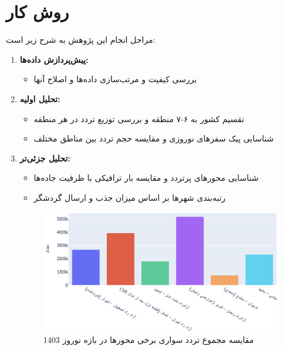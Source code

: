 \documentclass[a4paper, 12pt]{article}
\begin{document}
\section{روش کار}
مراحل انجام این پژوهش به شرح زیر است:
\begin{enumerate}
    \item \textbf{پیش‌پردازش داده‌ها:}
        \begin{itemize}
            \item بررسی کیفیت و مرتب‌سازی داده‌ها و اصلاح آنها
        \end{itemize}

    \item \textbf{تحلیل اولیه:} 
        \begin{itemize}
            \item تقسیم کشور به ۶-۷ منطقه و بررسی توزیع تردد در هر منطقه
            \item شناسایی پیک سفرهای نوروزی و مقایسه حجم تردد بین مناطق مختلف
        \end{itemize}

    \item \textbf{تحلیل جزئی‌تر:}
        \begin{itemize}
            \item شناسایی محورهای پرتردد و مقایسه بار ترافیکی با ظرفیت جاده‌ها
            \item رتبه‌بندی شهرها بر اساس میزان جذب و ارسال گردشگر
        \end{itemize}
    
        \begin{figure}[htbp]
            \centering
            \includegraphics[width=.8\textwidth]{bar-chart.png}
            \caption{مقایسه مجموع تردد سواری برخی محورها در بازه نوروز 1403}
        \end{figure}


\end{enumerate}
\end{document}
